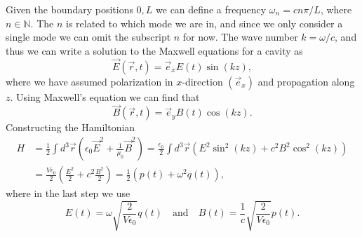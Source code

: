 
Given the boundary positions $0, L$ we can define a frequency $\omega_n = c n \pi / L$, where $n \in \mathbb{N}$. The $n$ is related to which mode we are in, and since we only consider a single mode we can omit the subscript $n$ for now. The wave number $k = \omega / c$, and thus we can write a solution to the Maxwell equations for a cavity as
\begin{equation}
    \vec{E}(\vec{r}, t) = \vec{e}_x E(t) \sin(kz),
\end{equation}
where we have assumed polarization in $x$-direction $(\vec{e}_x)$ and propagation along $z$. Using Maxwell's equation we can find that
\begin{equation}
    \vec{B}(\vec{r}, t) = \vec{e}_y B(t) \cos(kz).
\end{equation}
Constructing the Hamiltonian
\begin{align}
    H &= \frac{1}{2} \int d^3 \vec{r} \left( \epsilon_0 \vec{E}^2 + \frac{1}{\mu_0} \vec{B}^2 \right) = \frac{\epsilon_0}{2} \int d^3\vec{r} \left(E^2 \sin^2(kz)+ c^2 B^2 \cos^2(kz)\right) \\
    &=  \frac{V\epsilon_0}{2} \left(\frac{E^2}{2} +c^2 \frac{B^2}{2} \right) = \frac{1}{2} (p(t) + \omega^2 q(t)),
\end{align}
where in the last step we use 
\begin{equation}
    E(t) = \omega \sqrt{\frac{2}{V\epsilon_0}}q(t) \quad\text{and}\quad B(t) = \frac{1}{c} \sqrt{\frac{2}{V\epsilon_0}} p(t).
\end{equation}
